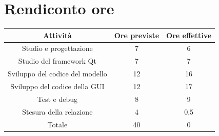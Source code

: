 \documentclass[10pt]{article}
\begin{document}
\section{Rendiconto ore}

\begin{center}
    \begin{tabular}{| c | c | c |} \hline
    Attività & Ore previste & Ore effettive \\\hline
    Studio e progettazione & 7 & 6 \\
    Studio del framework Qt & 7 & 7 \\
    Sviluppo del codice del modello & 12 & 16 \\
    Sviluppo del codice della GUI & 12 & 17 \\
    Test e debug & 8 & 9 \\
    Stesura della relazione & 4 & 0,5 \\\hline
    Totale & 40 & 0 \\\hline
    \end{tabular}
\end{center}
\end{document}
